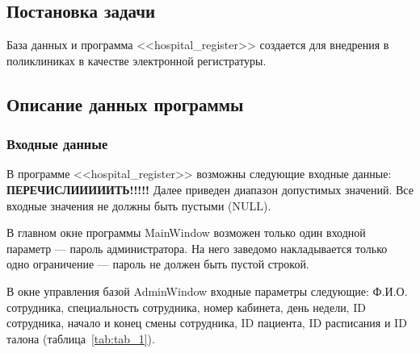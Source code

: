 \subsection{Постановка задачи}

База данных и программа <<hospital\_register>> создается для внедрения в поликлиниках в качестве электронной регистратуры.

\subsection{Описание данных программы}
\subsubsection{Входные данные}

В программе <<hospital\_register>> возможны следующие входные данные:
\textbf{ПЕРЕЧИСЛИИИИИТЬ!!!!!}
Далее приведен диапазон допустимых значений. Все входные значения не должны быть пустыми (NULL).

В главном окне программы MainWindow возможен только один входной параметр --- пароль администратора. На него заведомо накладывается только одно ограничение --- пароль не должен быть пустой строкой.

В окне управления базой AdminWindow входные параметры следующие: Ф.И.О. сотрудника, специальность сотрудника, номер кабинета, день недели, ID сотрудника, начало и конец смены сотрудника, ID пациента, ID расписания и ID талона (таблица~\ref{tab:tab_1}). 

